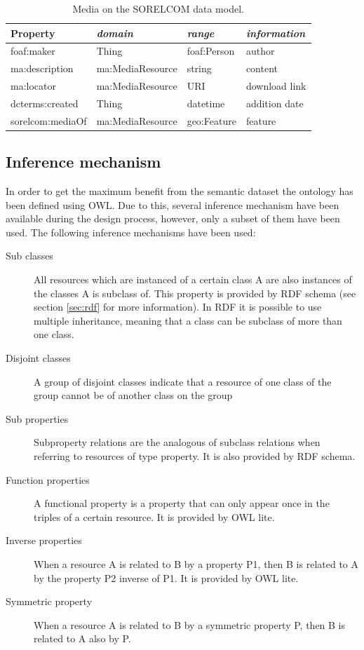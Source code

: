 \begin{table}[ht]
  \centering
  \caption{Media on the SORELCOM data model.}\label{tab:media}
  \begin{tabular}{llll}
    \toprule
      \textbf{Property} & \emph{domain}  & \emph{range} & \emph{information}\\
    \midrule
      foaf:maker & Thing & foaf:Person & author \\
      ma:description & ma:MediaResource & string & content \\
      ma:locator & ma:MediaResource & URI & download link \\
      dcterms:created & Thing & datetime & addition date \\
      sorelcom:mediaOf & ma:MediaResource & geo:Feature & feature \\
    \bottomrule
  \end{tabular}
\end{table}

\subsection*{Inference mechanism}

In order to get the maximum benefit from the semantic dataset the ontology has been defined using OWL. Due to this, several inference mechanism have been available during the design process, however, only a subset of them have been used. The following inference mechanisms have been used:

\begin{description}
\item[Sub classes] All resources which are instanced of a certain class A are also instances of the classes A is subclass of. This property is provided by RDF schema (see section \ref{sec:rdf} for more information). In RDF it is possible to use multiple inheritance, meaning that a class can be subclass of more than one class.
\item[Disjoint classes] A group of disjoint classes indicate that a resource of one class of the group cannot be of another class on the group
\item[Sub properties] Subproperty relations are the analogous of subclass relations when referring to resources of type property. It is also provided by RDF schema.
\item[Function properties] A functional property is a property that can only appear once in the triples of a certain resource. It is provided by OWL lite.
\item[Inverse properties] When a resource A is related to B by a property P1, then B is related to A by the property P2 inverse of P1. It is provided by OWL lite.
\item[Symmetric property] When a resource A is related to B by a symmetric property P, then B is related to A also by P.

\end{description}


